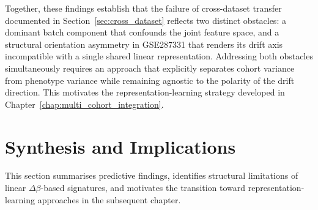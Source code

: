 Together, these findings establish that the failure of
cross-dataset transfer documented in
Section~\ref{sec:cross_dataset} reflects two distinct
obstacles: a dominant batch component that confounds the
joint feature space, and a structural orientation
asymmetry in GSE287331 that renders its drift axis
incompatible with a single shared linear representation.
Addressing both obstacles simultaneously requires an
approach that explicitly separates cohort variance from
phenotype variance while remaining agnostic to the
polarity of the drift direction. This motivates the
representation-learning strategy developed in
Chapter~\ref{chap:multi_cohort_integration}.

\section{Synthesis and Implications}

This section summarises predictive findings,
identifies structural limitations of linear
$\Delta\beta$-based signatures,
and motivates the transition toward
representation-learning approaches
in the subsequent chapter.
